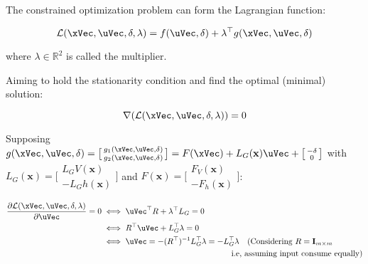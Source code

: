 The constrained optimization problem can form the Lagrangian function:

\begin{equation}
    \mathcal{L}(\xVec, \uVec, \delta, \lambda) = f(\uVec, \delta) + \lambda^{\top}g(\xVec, \uVec, \delta)
    \label{eq:lagrangian_function}
\end{equation}

where \(\lambda \in \mathbb{R}^2 \) is called the  multiplier. \par
Aiming to hold the stationarity condition and find the optimal (minimal) solution:

\begin{equation}
    \nabla(\mathcal{L}(\xVec, \uVec, \delta, \lambda)) = 0
    \label{eq:lagrangian_gradient_function}
\end{equation}

Supposing \(g(\xVec, \uVec, \delta) =  \bigl[\begin{smallmatrix} g_1(\xVec, \uVec, \delta) \\ g_2(\xVec, \uVec, \delta) \end{smallmatrix} \bigr]  = F(\xVec) + L_G(\mathbf{x})\uVec + \bigl[\begin{smallmatrix} -\delta \\ 0 \end{smallmatrix} \bigr] \) with \(L_G(\mathbf{x}) = \bigl[\begin{smallmatrix} L_GV(\mathbf{x}) \\ -L_Gh(\mathbf{x}) \end{smallmatrix} \bigr]\) and \(F(\mathbf{x}) = \bigl[\begin{smallmatrix} F_V(\mathbf{x}) \\ -F_h(\mathbf{x}) \end{smallmatrix} \bigr]\):

\begin{align}
    \frac{\partial \mathcal{L}(\xVec, \uVec, \delta, \lambda)}{\partial \uVec} = 0 &\iff \uVec^{\top}R + \lambda^{\top}L_G = 0  \notag \\
    &\iff R^{\top}\uVec + L_G^{\top}\lambda = 0 \notag \\
    &\iff \uVec =- (R^{\top})^{-1}L_G^{\top}\lambda = -L_G^{\top}\lambda \quad (\text{Considering } R = \mathbf{I}_{m \times m}  \label{eq:lagrangian_input_gradient_function} \\
    & \qquad \qquad \qquad \qquad \qquad \qquad \qquad \qquad \text{i.e, assuming input consume equally}) \notag
\end{align}


